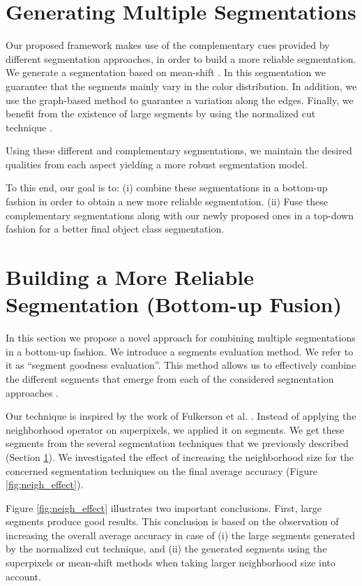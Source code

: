 \documentclass[10pt,twocolumn,letterpaper]{article}
\begin{document}
\section{Generating Multiple Segmentations}\label{GeneratMSeg}

Our proposed framework makes use of the complementary cues provided by different
segmentation approaches, in order to build a more reliable segmentation. We
generate a segmentation based on mean-shift \cite{Comaniciu02meanshift}.
In this segmentation we guarantee that the segments mainly vary in the color
distribution. In addition, we use the graph-based method
\cite{Felzenszwalb04efficientgraph-based} to guarantee a variation along the edges.
Finally, we benefit from the existence of large segments by using the
normalized cut technique \cite{Shi_2000_3808}.

Using these different and complementary segmentations, we maintain the desired
qualities from each aspect yielding a more robust segmentation model.

To this end, our goal is to: (i) combine these segmentations in a bottom-up
fashion in order to obtain a new more reliable segmentation. (ii) Fuse
these complementary segmentations along with our newly proposed ones in a
top-down fashion for a better final object class segmentation.

\section{Building a More Reliable Segmentation (Bottom-up Fusion)}\label{BuildSeg}

In this section we propose a novel approach for combining multiple segmentations in a bottom-up fashion.
We introduce a segments evaluation method. We refer to it as  ``segment goodness evaluation''.
This method allows us to effectively combine the different segments that emerge from each of the considered segmentation approaches .

Our technique is inspired by the work of Fulkerson et al. \cite{fulkerson09class}.
Instead of applying the neighborhood operator on superpixels, we applied it on segments.
We get these segments from the several segmentation techniques that we previously described (Section \ref{GeneratMSeg}).
We investigated the effect of increasing the neighborhood size for the concerned segmentation techniques on the final average accuracy (Figure \ref{fig:neigh_effect}).

Figure \ref{fig:neigh_effect} illustrates two important conclusions. First, large segments
produce good results. This conclusion is based on the observation of increasing the overall average accuracy in case of
(i) the large segments generated by the normalized cut technique, and
(ii) the generated segments using the superpixels or mean-shift methods when taking larger neighborhood size into account.
\end{document}
